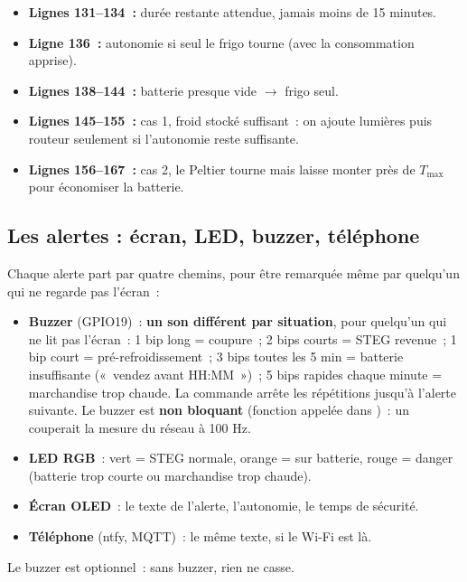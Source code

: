 
\begin{itemize}
  \item \textbf{Lignes 131--134~:} durée restante attendue, jamais moins de 15 minutes.
  \item \textbf{Ligne 136~:} autonomie si seul le frigo tourne (avec la consommation apprise).
  \item \textbf{Lignes 138--144~:} batterie presque vide $\rightarrow$ frigo seul.
  \item \textbf{Lignes 145--155~:} cas 1, froid stocké suffisant~: on ajoute lumières puis routeur seulement si l'autonomie reste suffisante.
  \item \textbf{Lignes 156--167~:} cas 2, le Peltier tourne mais laisse monter près de $T_{\max}$ pour économiser la batterie.
\end{itemize}

\subsection{Les alertes : écran, LED, buzzer, téléphone}
Chaque alerte part par quatre chemins, pour être remarquée même par quelqu'un qui ne regarde pas l'écran~:
\begin{itemize}[nosep]
  \item \textbf{Buzzer} (GPIO19)~: \textbf{un son différent par situation}, pour quelqu'un qui ne lit pas l'écran~: 1 bip long = coupure~; 2 bips courts = STEG revenue~; 1 bip court = pré-refroidissement~; 3 bips toutes les 5 min = batterie insuffisante («~vendez avant HH:MM~»)~; 5 bips rapides chaque minute = marchandise trop chaude. La commande  arrête les répétitions jusqu'à l'alerte suivante. Le buzzer est \textbf{non bloquant} (fonction  appelée dans )~: un  couperait la mesure du réseau à 100 Hz.
  \item \textbf{LED RGB}~: vert = STEG normale, orange = sur batterie, rouge = danger (batterie trop courte ou marchandise trop chaude).
  \item \textbf{Écran OLED}~: le texte de l'alerte, l'autonomie, le temps de sécurité.
  \item \textbf{Téléphone} (ntfy, MQTT)~: le même texte, si le Wi-Fi est là.
\end{itemize}
Le buzzer est optionnel~: sans buzzer, rien ne casse.

